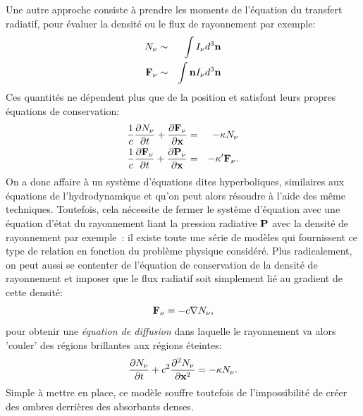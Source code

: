 Une autre approche consiste à prendre les moments de l'équation du transfert radiatif, pour évaluer la densité ou le flux de rayonnement par exemple:
\begin{eqnarray}
N_\nu&\sim&\int I_\nu d^3{\bf n}\\
{\bf F}_\nu&\sim&\int {\bf n} I_\nu d^3{\bf n}
\end{eqnarray}
Ces quantités ne dépendent plus que de la position et satisfont leurs propres équations de conservation:
\begin{eqnarray}
\frac{1}{c}\frac{\partial N_\nu}{\partial t}+\frac{\partial {{\bf F}_\nu}}{\partial {\bf x}}&=&-\kappa N_\nu\\
\frac{1}{c}\frac{\partial {\bf F}_\nu}{\partial t}+\frac{\partial {{\bf P}_\nu}}{\partial {\bf x}}&=&-\kappa' {\bf F}_\nu.
\end{eqnarray}
On a donc affaire à un système d'équations dites hyperboliques, similaires aux équations de l'hydrodynamique et qu'on peut alors résoudre à l'aide des même techniques. Toutefois, cela nécessite de fermer le système d'équation avec une équation d'état du rayonnement liant la pression radiative $\bf P$ avec la densité de rayonnement par exemple~: il existe toute une série de modèles qui fournissent ce type de relation en fonction du problème physique considéré. Plus radicalement, on peut aussi se contenter de l'équation de conservation de la densité de rayonnement et imposer que le flux radiatif soit simplement lié au gradient de cette densité:
\begin{equation}
{\bf F_\nu}=-c\nabla N_\nu,
\end{equation}
pour obtenir une \textit{équation de diffusion} dans laquelle le rayonnement va alors 'couler' des régions brillantes aux régions éteintes:
\begin{equation}
\frac{\partial N_\nu}{\partial t}+c^2\frac{\partial^2 {N_\nu}}{\partial {\bf x}^2}=-\kappa N_\nu.
\end{equation}
 Simple à mettre en place, ce modèle souffre toutefois de l'impossibilité de créer des ombres derrières des absorbants denses.

